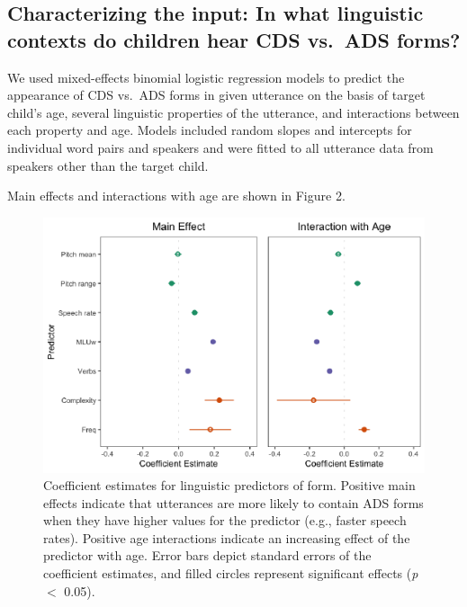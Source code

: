 \documentclass[10pt, letterpaper]{article}
\newenvironment{CodeChunk}{}{}
\begin{document}
\hypertarget{characterizing-the-input-in-what-linguistic-contexts-do-children-hear-cds-vs.-ads-forms}{%
\subsection{Characterizing the input: In what linguistic contexts do
children hear CDS vs.~ADS
forms?}\label{characterizing-the-input-in-what-linguistic-contexts-do-children-hear-cds-vs.-ads-forms}}

We used mixed-effects binomial logistic regression models to predict the
appearance of CDS vs.~ADS forms in given utterance on the basis of
target child's age, several linguistic properties of the utterance, and
interactions between each property and age. Models included random
slopes and intercepts for individual word pairs and speakers and were
fitted to all utterance data from speakers other than the target child.

Main effects and interactions with age are shown in Figure 2.

\begin{CodeChunk}
\begin{figure}[H]

{\centering \includegraphics{figs/model-plot-1} 

}

\caption[Coefficient estimates for linguistic predictors of form]{Coefficient estimates for linguistic predictors of form. Positive main effects indicate that utterances are more likely to contain ADS forms when they have higher values for the predictor (e.g., faster speech rates). Positive age interactions indicate an increasing effect of the predictor with age. Error bars depict standard errors of the coefficient estimates, and filled circles represent significant effects (\textit{p} $<$ 0.05).}\label{fig:model-plot}
\end{figure}
\end{CodeChunk}
\end{document}
